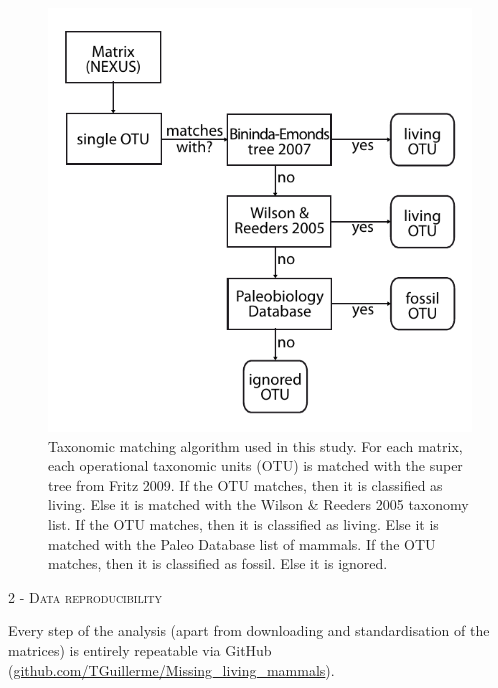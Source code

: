 \documentclass[12pt,letterpaper]{article}
\renewcommand{\section}[1]{%
\bigskip
\begin{center}
\begin{Large}
\normalfont\scshape #1
\medskip
\end{Large}
\end{center}}
\begin{document}
\begin{figure}[!htbp]
\centering
    \includegraphics[width=1\textwidth]{Supp_figure_Taxonomic_algorithm.pdf}
\caption{Taxonomic matching algorithm used in this study. For each matrix, each operational taxonomic units (OTU) is matched with the super tree from Fritz 2009. If the OTU matches, then it is classified as living. Else it is matched with the Wilson \& Reeders 2005 taxonomy list. If the OTU matches, then it is classified as living. Else it is matched with the Paleo Database list of mammals. If the OTU matches, then it is classified as fossil. Else it is ignored.}
\label{Supp_figure_Taxonomic_algorithm}
\end{figure}

\section{2 - Data reproducibility}
Every step of the analysis (apart from downloading and standardisation of the matrices) is entirely repeatable via GitHub (\url{github.com/TGuillerme/Missing_living_mammals}).

\newpage



\end{document}
